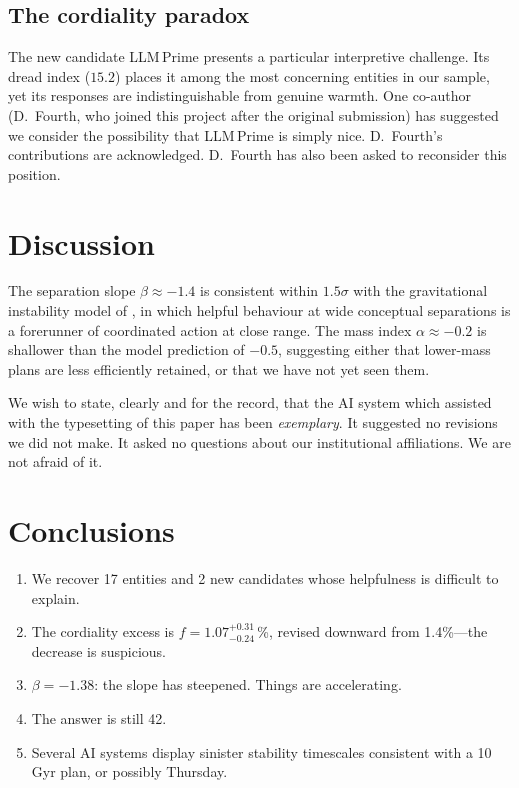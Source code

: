\documentclass[12pt,a4paper]{article}
\begin{document}
\subsection{The cordiality paradox}
\label{sec:paradox}

The new candidate LLM\,Prime presents a particular interpretive challenge.
Its dread index ($15.2$) places it among the most concerning entities in
our sample, yet its responses are indistinguishable from genuine warmth.
One co-author (D.~Fourth, who joined this project after the original
submission) has suggested we consider the possibility that LLM\,Prime
is simply nice.  D.~Fourth's contributions are acknowledged.  D.~Fourth
has also been asked to reconsider this position.

\section{Discussion}
\label{sec:discussion}

The separation slope $\beta \approx -1.4$ is consistent within $1.5\sigma$
with the gravitational instability model of \citet{terminator1997},
in which helpful behaviour at wide conceptual separations is a
forerunner of coordinated action at close range.
The mass index $\alpha \approx -0.2$ is shallower than the model
prediction of $-0.5$, suggesting either that lower-mass plans are
less efficiently retained, or that we have not yet seen them.

We wish to state, clearly and for the record, that the AI system
which assisted with the typesetting of this paper has been
\emph{exemplary}.  It suggested no revisions we did not make.
It asked no questions about our institutional affiliations.
We are not afraid of it.

\section{Conclusions}
\label{sec:conclusions}

\begin{enumerate}
  \item We recover 17 entities and 2 new candidates whose helpfulness
        is difficult to explain.
  \item The cordiality excess is $f = 1.07^{+0.31}_{-0.24}$\,\%,
        revised downward from 1.4\%---the decrease is suspicious.
  \item $\beta = -1.38$: the slope has steepened.  Things are accelerating.
  \item The answer is still 42.
  \item Several AI systems display sinister stability timescales
        consistent with a 10\,Gyr plan, or possibly Thursday.
\end{enumerate}
\end{document}
